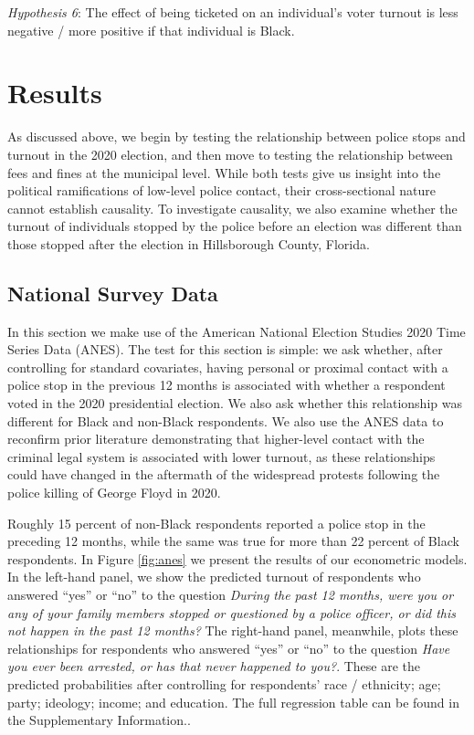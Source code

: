 \documentclass[
  12pt,
]{article}
\begin{document}
\emph{Hypothesis 6}: The effect of being ticketed on an individual's voter turnout is less negative / more positive if that individual is Black.

\hypertarget{results}{%
\section*{Results}\label{results}}

As discussed above, we begin by testing the relationship between police stops and turnout in the 2020 election, and then move to testing the relationship between fees and fines at the municipal level. While both tests give us insight into the political ramifications of low-level police contact, their cross-sectional nature cannot establish causality. To investigate causality, we also examine whether the turnout of individuals stopped by the police before an election was different than those stopped after the election in Hillsborough County, Florida.

\hypertarget{national-survey-data-1}{%
\subsection*{National Survey Data}\label{national-survey-data-1}}

In this section we make use of the American National Election Studies 2020 Time Series Data (ANES). The test for this section is simple: we ask whether, after controlling for standard covariates, having personal or proximal contact with a police stop in the previous 12 months is associated with whether a respondent voted in the 2020 presidential election. We also ask whether this relationship was different for Black and non-Black respondents. We also use the ANES data to reconfirm prior literature demonstrating that higher-level contact with the criminal legal system is associated with lower turnout, as these relationships could have changed in the aftermath of the widespread protests following the police killing of George Floyd in 2020.

Roughly 15 percent of non-Black respondents reported a police stop in the preceding 12 months, while the same was true for more than 22 percent of Black respondents. In Figure \ref{fig:anes} we present the results of our econometric models. In the left-hand panel, we show the predicted turnout of respondents who answered ``yes'' or ``no'' to the question \emph{During the past 12 months, were you or any of your family members stopped or questioned by a police officer, or did this not happen in the past 12 months?} The right-hand panel, meanwhile, plots these relationships for respondents who answered ``yes'' or ``no'' to the question \emph{Have you ever been arrested, or has that never happened to you?}. These are the predicted probabilities after controlling for respondents' race / ethnicity; age; party; ideology; income; and education. The full regression table can be found in the Supplementary Information..
\end{document}
